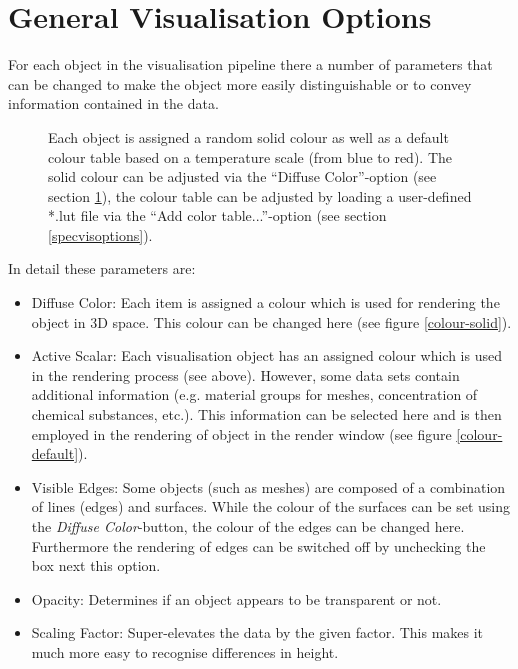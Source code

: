 \section{General Visualisation Options}
\label{genvisoptions}

For each object in the visualisation pipeline there a number of parameters that can be changed to make the object more easily distinguishable or to convey information contained in the data.

\begin{figure}[tb]
\begin{center}
\enspace
{}\enspace
{}
\end{center}
\caption{Each object is assigned a random solid colour as well as a default colour table based on a temperature scale (from blue to red). The solid colour can be adjusted via the ``Diffuse Color''-option (see section \ref{genvisoptions}), the colour table can be adjusted by loading a user-defined *.lut file via the ``Add color table...''-option (see section \ref{specvisoptions}).} \label{fig:colours}
\end{figure}

In detail these parameters are:

\begin{itemize}
\item Diffuse Color: Each item is assigned a colour which is used for rendering the object in 3D space. This colour can be changed here (see figure \ref{colour-solid}).
\item Active Scalar: Each visualisation object has an assigned colour which is used in the rendering process (see above). However, some data sets contain additional information (e.g. material groups for meshes, concentration of chemical substances, etc.). This information can be selected here and is then employed in the rendering of object in the render window (see figure \ref{colour-default}).
\item Visible Edges: Some objects (such as meshes) are composed of a combination of lines (edges) and surfaces. While the colour of the surfaces can be set using the \emph{Diffuse Color}-button, the colour of the edges can be changed here. Furthermore the rendering of edges can be switched off by unchecking the box next this option.
\item Opacity: Determines if an object appears to be transparent or not.
\item Scaling Factor: Super-elevates the data by the given factor. This makes it much more easy to recognise differences in height.
\end{itemize}

